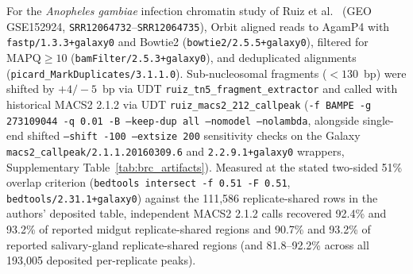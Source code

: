 \documentclass[11pt,letterpaper]{article}
\newcommand{\tool}[1]{\textsf{#1}}
\begin{document}
For the \textit{Anopheles gambiae} infection chromatin study of Ruiz et al.\ \cite{ruiz2021} (GEO GSE152924, \texttt{SRR12064732}--\texttt{SRR12064735}), \tool{Orbit} aligned reads to AgamP4 with \nolinkurl{fastp/1.3.3+galaxy0} and \tool{Bowtie2} (\nolinkurl{bowtie2/2.5.5+galaxy0}), filtered for $\text{MAPQ} \ge 10$ (\nolinkurl{bamFilter/2.5.3+galaxy0}), and deduplicated alignments (\nolinkurl{picard_MarkDuplicates/3.1.1.0}). Sub-nucleosomal fragments ($< 130$~bp) were shifted by $+4/-5$~bp via UDT \nolinkurl{ruiz_tn5_fragment_extractor} and called with historical \tool{MACS2} 2.1.2 via UDT \nolinkurl{ruiz_macs2_212_callpeak} (\texttt{-f BAMPE -g 273109044 -q 0.01 -B --keep-dup all --nomodel --nolambda}, alongside single-end shifted \texttt{--shift -100 --extsize 200} sensitivity checks on the Galaxy \nolinkurl{macs2_callpeak/2.1.1.20160309.6} and \nolinkurl{2.2.9.1+galaxy0} wrappers, Supplementary Table~\ref{tab:brc_artifacts}). Measured at the stated two-sided 51\% overlap criterion (\texttt{bedtools intersect -f 0.51 -F 0.51}, \nolinkurl{bedtools/2.31.1+galaxy0}) against the 111,586 replicate-shared rows in the authors' deposited table, independent \tool{MACS2} 2.1.2 calls recovered 92.4\% and 93.2\% of reported midgut replicate-shared regions and 90.7\% and 93.2\% of reported salivary-gland replicate-shared regions (and 81.8--92.2\% across all 193,005 deposited per-replicate peaks).
\end{document}
